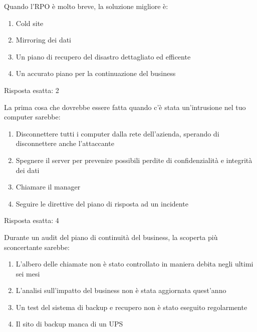 \begin{Exercise} [
  title={RTO Stretto},
  label={bcdr3}
 ]

 \Question Quando l'RPO è molto breve, la soluzione migliore è:
 \begin{enumerate}
  \item Cold site
  \item Mirroring dei dati
  \item Un piano di recupero del disastro dettagliato ed efficente
  \item Un accurato piano per la continuazione del business
 \end{enumerate}

\end{Exercise}

\begin{Answer} [
  ref={bcdr3},
  number={3}
 ]

 \Question Risposta esatta: 2
\end{Answer}

\label{EsBCDR2}

\begin{Exercise} [
  title={Azioni da intraprendere},
  label={bcdr4}
 ]

 \Question La prima cosa che dovrebbe essere fatta quando c'è stata 
 un'intrusione nel tuo computer sarebbe:
 \begin{enumerate}
   \item Disconnettere tutti i computer dalla rete dell'azienda, sperando di
   disconnettere anche l'attaccante
   \item Spegnere il server per prevenire possibili perdite di confidenzialità
   e integrità dei dati
   \item Chiamare il manager
   \item Seguire le direttive del piano di risposta ad un incidente
 \end{enumerate}

\end{Exercise}

\begin{Answer} [
  ref={bcdr4},
  number={4}
 ]

 \Question Risposta esatta: 4
\end{Answer}


\begin{Exercise} [
  title={Domanda su BCP},
  label={bcdr5}
 ]

 \Question Durante un audit del piano di continuità del business, la scoperta
 più sconcertante sarebbe:
 \begin{enumerate}
   \item L'albero delle chiamate non è stato controllato in maniera debita
   negli ultimi sei mesi
   \item L'analisi sull'impatto del business non è stata aggiornata quest'anno
   \item Un test del sistema di backup e recupero non è stato eseguito
   regolarmente
   \item Il sito di backup manca di un UPS
 \end{enumerate}

\end{Exercise}


